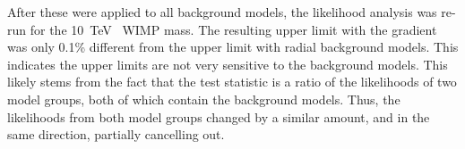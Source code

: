   After these were applied to all background models, the likelihood analysis was re-run for the \SI{10}{\TeV{}} WIMP mass.
  The resulting upper limit with the gradient was only 0.1\% different from the upper limit with radial background models.
  This indicates the upper limits are not very sensitive to the background models.
  This likely stems from the fact that the test statistic is a ratio of the likelihoods of two model groups, both of which contain the background models.
  Thus, the likelihoods from both model groups changed by a similar amount, and in the same direction, partially cancelling out.



